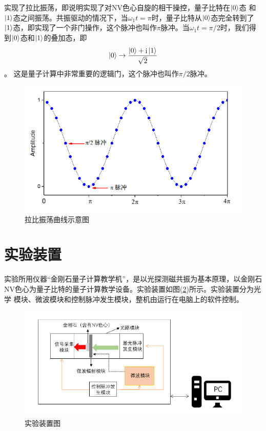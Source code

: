 \documentclass[a4paper]{article}
\DeclareMathOperator{\I}{\mathrm{i}}
\begin{document}
实现了拉比振荡，即说明实现了对NV色心自旋的相干操控，量子比特在$ \ket{0} $态
和$ \ket{1} $态之间振荡。共振驱动的情况下，当$ \omega_1 t = \pi $时，量子比特从$ \ket{0} $态完全转到了$ \ket{1} $态，即实现了一个非门操作，这个脉冲也叫作$ \pi $脉冲。当$ \omega_1 t = \pi/2 $时，我们得到$ \ket{0} $态和$ \ket{1} $的叠加态，即 
\begin{equation}\label{key}
\ket{0} \rightarrow \dfrac{\ket{0} + \I\ket{1}}{\sqrt{2}} 
\end{equation}。
这是量子计算中非常重要的逻辑门，这个脉冲也叫作$ \pi/2 $脉冲。
\begin{figure}[H]
	\centering
	\includegraphics[width=0.7\linewidth]{fig/rabi.jpg}
	\caption{拉比振荡曲线示意图}
	\label{fig:rabi}
\end{figure}

\section{实验装置}
实验所用仪器“金刚石量子计算教学机”，是以光探测磁共振为基本原理，以金刚石
NV色心为量子比特的量子计算教学设备。实验装置如图(\ref{fig:equip})所示。实验装置分为光学
模块、微波模块和控制脉冲发生模块，整机由运行在电脑上的软件控制。
\begin{figure}[H]
	\centering
	\includegraphics[width=0.9\linewidth]{fig/equip.jpg}
	\caption{实验装置图}
	\label{fig:equip}
\end{figure}
\end{document}
